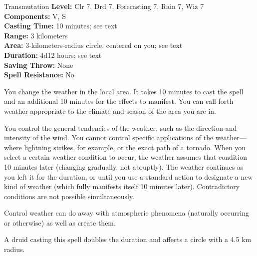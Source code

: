 {Transmutation}
{
	\textbf{Level:}
	Clr 7, Drd 7, Forecasting 7, Rain 7, Wiz 7\\
	\textbf{Components:}
	V, S\\
	\textbf{Casting Time:}
	10 minutes; see text\\
	\textbf{Range:}
	3 kilometers\\
	\textbf{Area:}
	3-kilometers-radius circle, centered on you; see text\\
	\textbf{Duration:}
	4d12 hours; see text\\
	\textbf{Saving Throw:}
	None\\
	\textbf{Spell Resistance:}
	No\\
}
{

	You change the weather in the local area. It takes 10 minutes to cast the spell and an additional 10 minutes for the effects to manifest. You can call forth weather appropriate to the climate and season of the area you are in.

	You control the general tendencies of the weather, such as the direction and intensity of the wind. You cannot control specific applications of the weather---where lightning strikes, for example, or the exact path of a tornado. When you select a certain weather condition to occur, the weather assumes that condition 10 minutes later (changing gradually, not abruptly). The weather continues as you left it for the duration, or until you use a standard action to designate a new kind of weather (which fully manifests itself 10 minutes later). Contradictory conditions are not possible simultaneously.

	Control weather can do away with atmospheric phenomena (naturally occurring or otherwise) as well as create them.

	A druid casting this spell doubles the duration and affects a circle with a 4.5 km radius.

}
